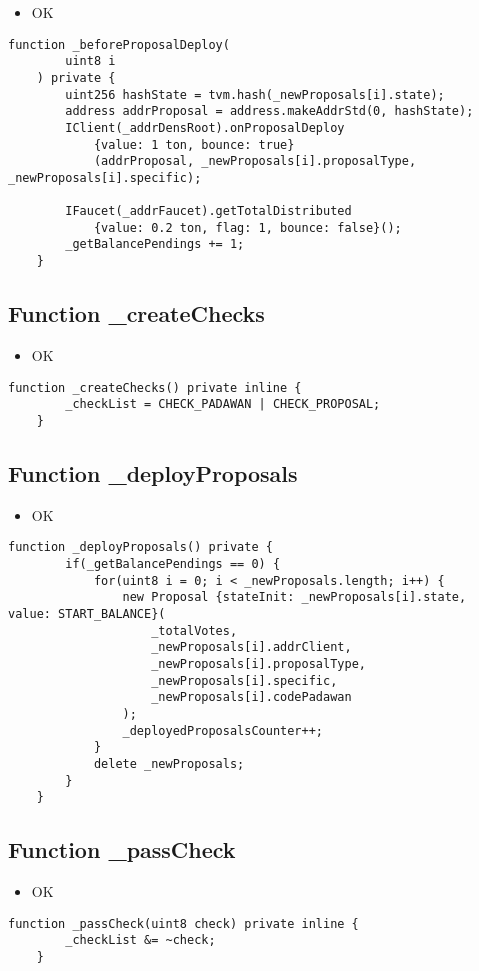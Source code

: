 \begin{itemize}
\item OK
\end{itemize}

\begin{lstlisting}[firstnumber=134]
    function _beforeProposalDeploy(
        uint8 i
    ) private {
        uint256 hashState = tvm.hash(_newProposals[i].state);
        address addrProposal = address.makeAddrStd(0, hashState);
        IClient(_addrDensRoot).onProposalDeploy
            {value: 1 ton, bounce: true}
            (addrProposal, _newProposals[i].proposalType, _newProposals[i].specific);

        IFaucet(_addrFaucet).getTotalDistributed
            {value: 0.2 ton, flag: 1, bounce: false}();
        _getBalancePendings += 1;
    }
\end{lstlisting}

\subsection{Function \_{}createChecks}

\begin{itemize}
\item OK
\end{itemize}

\begin{lstlisting}[firstnumber=54]
    function _createChecks() private inline {
        _checkList = CHECK_PADAWAN | CHECK_PROPOSAL;
    }
\end{lstlisting}

\subsection{Function \_{}deployProposals}

\begin{itemize}
\item OK
\end{itemize}

\begin{lstlisting}[firstnumber=156]
    function _deployProposals() private {
        if(_getBalancePendings == 0) {
            for(uint8 i = 0; i < _newProposals.length; i++) {
                new Proposal {stateInit: _newProposals[i].state, value: START_BALANCE}(
                    _totalVotes,
                    _newProposals[i].addrClient,
                    _newProposals[i].proposalType,
                    _newProposals[i].specific,
                    _newProposals[i].codePadawan
                );
                _deployedProposalsCounter++;
            }
            delete _newProposals;
        }
    }
\end{lstlisting}

\subsection{Function \_{}passCheck}

\begin{itemize}
\item OK
\end{itemize}

\begin{lstlisting}[firstnumber=58]
    function _passCheck(uint8 check) private inline {
        _checkList &= ~check;
    }
\end{lstlisting}
